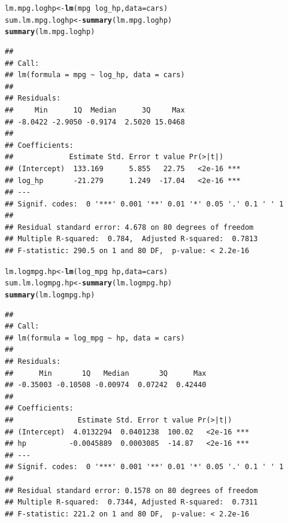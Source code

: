 \documentclass{article}\usepackage[]{graphicx}\usepackage[]{color}
\makeatletter
\newcommand{\hlopt}[1]{\textcolor[rgb]{0,0,0}{#1}}%
\newcommand{\hlstd}[1]{\textcolor[rgb]{0.345,0.345,0.345}{#1}}%
\newcommand{\hlkwb}[1]{\textcolor[rgb]{0.69,0.353,0.396}{#1}}%
\newcommand{\hlkwc}[1]{\textcolor[rgb]{0.333,0.667,0.333}{#1}}%
\newcommand{\hlkwd}[1]{\textcolor[rgb]{0.737,0.353,0.396}{\textbf{#1}}}%
\newenvironment{kframe}{%
 \def\at@end@of@kframe{}%
 \ifinner\ifhmode%
  \def\at@end@of@kframe{\end{minipage}}%
  \begin{minipage}{\columnwidth}%
 \fi\fi%
 \def\FrameCommand##1{\hskip\@totalleftmargin \hskip-\fboxsep
 \colorbox{shadecolor}{##1}\hskip-\fboxsep
     \hskip-\linewidth \hskip-\@totalleftmargin \hskip\columnwidth}%
 \MakeFramed {\advance\hsize-\width
   \@totalleftmargin\z@ \linewidth\hsize
   \@setminipage}}%
 {\par\unskip\endMakeFramed%
 \at@end@of@kframe}
\newenvironment{knitrout}{}{} %
\makeatother
\begin{document}
\begin{knitrout}
\begin{kframe}\begin{alltt}
\hlstd{lm.mpg.loghp} \hlkwb{<-} \hlkwd{lm}\hlstd{(mpg} \hlopt{~} \hlstd{log_hp,} \hlkwc{data} \hlstd{= cars)}
\hlstd{sum.lm.mpg.loghp} \hlkwb{<-} \hlkwd{summary}\hlstd{(lm.mpg.loghp)}
\hlkwd{summary}\hlstd{(lm.mpg.loghp)}
\end{alltt}
\begin{verbatim}
## 
## Call:
## lm(formula = mpg ~ log_hp, data = cars)
## 
## Residuals:
##     Min      1Q  Median      3Q     Max 
## -8.0422 -2.9050 -0.9174  2.5020 15.0468 
## 
## Coefficients:
##             Estimate Std. Error t value Pr(>|t|)    
## (Intercept)  133.169      5.855   22.75   <2e-16 ***
## log_hp       -21.279      1.249  -17.04   <2e-16 ***
## ---
## Signif. codes:  0 '***' 0.001 '**' 0.01 '*' 0.05 '.' 0.1 ' ' 1
## 
## Residual standard error: 4.678 on 80 degrees of freedom
## Multiple R-squared:  0.784,	Adjusted R-squared:  0.7813 
## F-statistic: 290.5 on 1 and 80 DF,  p-value: < 2.2e-16
\end{verbatim}
\begin{alltt}
\hlstd{lm.logmpg.hp} \hlkwb{<-} \hlkwd{lm}\hlstd{(log_mpg} \hlopt{~} \hlstd{hp,} \hlkwc{data} \hlstd{= cars)}
\hlstd{sum.lm.logmpg.hp} \hlkwb{<-} \hlkwd{summary}\hlstd{(lm.logmpg.hp)}
\hlkwd{summary}\hlstd{(lm.logmpg.hp)}
\end{alltt}
\begin{verbatim}
## 
## Call:
## lm(formula = log_mpg ~ hp, data = cars)
## 
## Residuals:
##      Min       1Q   Median       3Q      Max 
## -0.35003 -0.10508 -0.00974  0.07242  0.42440 
## 
## Coefficients:
##               Estimate Std. Error t value Pr(>|t|)    
## (Intercept)  4.0132294  0.0401238  100.02   <2e-16 ***
## hp          -0.0045889  0.0003085  -14.87   <2e-16 ***
## ---
## Signif. codes:  0 '***' 0.001 '**' 0.01 '*' 0.05 '.' 0.1 ' ' 1
## 
## Residual standard error: 0.1578 on 80 degrees of freedom
## Multiple R-squared:  0.7344,	Adjusted R-squared:  0.7311 
## F-statistic: 221.2 on 1 and 80 DF,  p-value: < 2.2e-16
\end{verbatim}
\end{kframe}
\end{knitrout}
\end{document}
